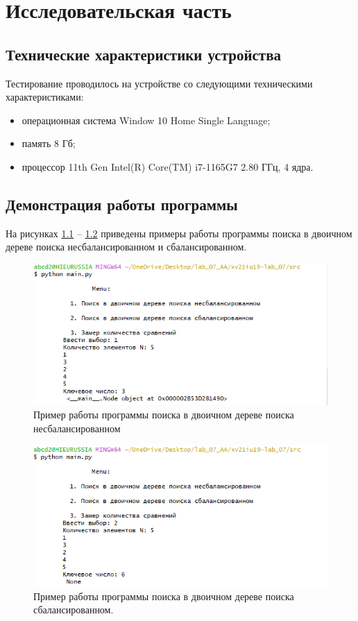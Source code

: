 \chapter{Исследовательская часть}

\section{Технические характеристики устройства}

Тестирование проводилось на устройстве со следующими техническими характеристиками:

\begin{itemize}
	\item операционная система Window 10 Home Single Language;
	\item память 8 Гб;
	\item процессор 11th Gen Intel(R) Core(TM) i7-1165G7 2.80 ГГц, 4 ядра.
\end{itemize}

\section{Демонстрация работы программы}
На рисунках \ref{fig:ex1} -- \ref{fig:ex2} приведены примеры работы программы поиска в двоичном дереве поиска несбалансированном и сбалансированном.
\begin{figure}[h]
	\centering
	\includegraphics[scale=0.9]{img/ex1.png}
	\caption{Пример работы программы поиска в двоичном дереве поиска несбалансированном}
	\label{fig:ex1}
\end{figure}
\clearpage
\begin{figure}[h]
	\centering
	\includegraphics[scale=0.9]{img/ex2.png}
	\caption{Пример работы программы поиска в двоичном дереве поиска сбалансированном.}
	\label{fig:ex2}
\end{figure}

